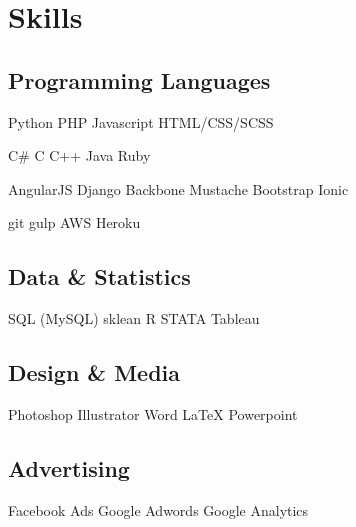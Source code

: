 \section{Skills}
\subsection{Programming Languages}

Python \textbullet{} PHP \textbullet{} Javascript \textbullet{} HTML/CSS/SCSS \\
\sectionsep

C\# \textbullet{} C \textbullet{} C++ \textbullet{} Java \textbullet{} Ruby
\sectionsep

AngularJS \textbullet{} Django \textbullet{} Backbone \textbullet{} Mustache \textbullet{} Bootstrap \textbullet{} Ionic
\sectionsep

git \textbullet{} gulp \textbullet{} AWS \textbullet{} Heroku
\sectionsep

\subsection{Data \& Statistics}
SQL (MySQL) \textbullet{} sklean \textbullet{} R \textbullet{} STATA \textbullet{} Tableau\\
\sectionsep

\subsection{Design \& Media}
Photoshop \textbullet{} Illustrator \textbullet{} Word \textbullet{} LaTeX \textbullet{} Powerpoint \\
\sectionsep

\subsection{Advertising}
Facebook Ads \textbullet{} Google Adwords \textbullet{} Google Analytics \\
\sectionsep
